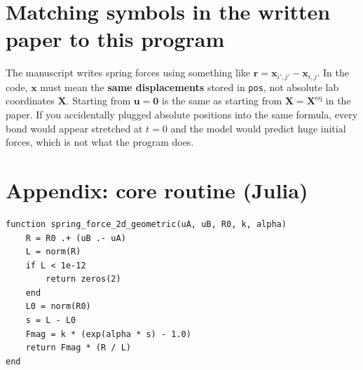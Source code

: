 \documentclass[11pt,a4paper]{article}
\begin{document}
\section{Matching symbols in the written paper to this program}
\label{sec:notation}

The manuscript writes spring forces using something like $\mathbf{r} = \mathbf{x}_{i',j'}-\mathbf{x}_{i,j}$. In the code, $\mathbf{x}$ must mean the \textbf{same displacements} stored in \texttt{pos}, not absolute lab coordinates $\mathbf{X}$. Starting from $\mathbf{u}=\mathbf{0}$ is the same as starting from $\mathbf{X}=\mathbf{X}^{\mathrm{eq}}$ in the paper. If you accidentally plugged absolute positions into the same formula, every bond would appear stretched at $t=0$ and the model would predict huge initial forces, which is not what the program does.

\section*{Appendix: core routine (Julia)}
\begin{lstlisting}
function spring_force_2d_geometric(uA, uB, R0, k, alpha)
    R = R0 .+ (uB .- uA)
    L = norm(R)
    if L < 1e-12
        return zeros(2)
    end
    L0 = norm(R0)
    s = L - L0
    Fmag = k * (exp(alpha * s) - 1.0)
    return Fmag * (R / L)
end
\end{lstlisting}
\end{document}
